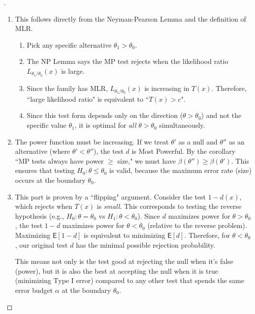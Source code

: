 \begin{proof}[]
    \leavevmode
        \begin{enumerate}[label=\roman*)]
            \item 
This follows directly from the Neyman-Pearson Lemma and the definition of MLR.
\begin{enumerate}[label=\arabic*.]
\item  Pick any specific alternative $\theta_1 > \theta_0$.
\item  The NP Lemma says the MP test rejects when the likelihood ratio $L_{\theta_1/\theta_0}(x)$ is large.
\item Since the family has MLR, $L_{\theta_1/\theta_0}(x)$ is increasing in $T(x)$. Therefore, ``large likelihood ratio" is equivalent to ``$T(x) > c$".
\item  Since this test form depends only on the direction ($\theta > \theta_0$) and not the specific value $\theta_1$, it is optimal for \textit{all} $\theta > \theta_0$ simultaneously.
\end{enumerate}

\item 
The power function must be increasing. If we treat $\theta'$ as a null and $\theta''$ as an alternative (where $\theta' < \theta''$), the test $d$ is Most Powerful. By the corollary ``MP tests always have power $\ge$ size," we must have $\beta(\theta'') \ge \beta(\theta')$. This ensures that testing $H_0: \theta \le \theta_0$ is valid, because the maximum error rate (size) occurs at the boundary $\theta_0$.

\item 
This part is proven by a ``flipping" argument.
Consider the test $1-d(x)$, which rejects when $T(x)$ is \textit{small}. This corresponds to testing the reverse hypothesis (e.g., $H_0: \theta = \theta_0$ vs $H_1: \theta < \theta_0$).
Since $d$ maximizes power for $\theta > \theta_0$, the test $1-d$ maximizes power for $\theta < \theta_0$ (relative to the reverse problem).
Maximizing $\mathsf{E}[1-d]$ is equivalent to minimizing $\mathsf{E}[d]$. Therefore, for $\theta < \theta_0$, our original test $d$ has the minimal possible rejection probability.

\begin{note}
This means not only is the test good at rejecting the null when it's false (power), but it is also the best at accepting the null when it is true (minimizing Type I error) compared to any other test that spends the same error budget $\alpha$ at the boundary $\theta_0$.
\end{note}
        \end{enumerate}
\end{proof}

